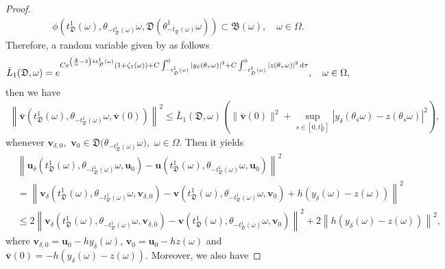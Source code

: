 \documentclass{elsarticle}
\theoremstyle{definition}
\numberwithin{equation}{section}
\renewcommand{\d}{{\rm{d}}}
\begin{document}
\begin{proof}
\begin{align}
 \phi \left ( t_{\mathfrak D}^1(\omega) , \theta_{-t_{\mathfrak D}^1(\omega)}\omega, \mathfrak D(\theta_{- t_{\mathfrak D}(\omega) }^1\omega) \right ) \subset \mathfrak B(\omega), \quad \omega\in \Omega .
\end{align}
Therefore,  a random variable given by as follows
\begin{align*}
\bar{L}_1({\mathfrak D}, \omega)=e^{C  e^{ \left(\frac 4 \alpha -3  \right)\lambda  t_{\mathfrak D}^1(\omega)}    ( 1+\zeta_1(\omega)  ) + C\int_{-t_{\mathfrak D}^1(\omega)}^0|y_\delta(\theta_{\tau} \omega)|^2+ C\int_{-t_{\mathfrak D}^1(\omega)}^0|z(\theta_{\tau} \omega)|^2 \, \d \tau } ,\quad \omega\in \Omega,
\end{align*}
then we have
\begin{align}
\left \|\bar{\textbf{v}} \! \left ( t_{\mathfrak D}^1 (\omega) ,\theta_{-t_{\mathfrak D}^1(\omega)}\omega, \bar{\textbf{v}}(0) \right) \right \|^2
 \leq \bar{L}_1({\mathfrak D}, \omega)\left (\|\bar{\textbf{v}}(0)\|^2+\sup\limits_{s\in[0,t_{\mathfrak D}^1]}|y_\delta(\theta_s\omega)-z(\theta_s\omega)|^2\right ) ,
\end{align}
whenever $\textbf{v}_{\delta,0},$ $\textbf{v}_{0}\in \mathfrak D \big ( \theta_{-t_{\mathfrak D}^1( \omega)}\omega \big),$  $\omega\in \Omega$. Then it yields
\begin{align*}
&\left \| \textbf{u}_\delta \! \left ( t_{\mathfrak D}^1 (\omega) ,\theta_{-t_{\mathfrak D}^1(\omega)}\omega,  \textbf{u}_{0}\right)
 - \textbf{u} \! \left ( t_{\mathfrak D}^1 (\omega) ,\theta_{-t_{\mathfrak D}^1(\omega)}\omega, \textbf{u}_{0}\right) \right \|^2
 \nonumber\\
& =\left \| \textbf{v}_\delta \! \left ( t_{\mathfrak D}^1 (\omega) ,\theta_{-t_{\mathfrak D}^1(\omega)}\omega,  \textbf{v}_{\delta,0}\right)
 - \textbf{v} \! \left ( t_{\mathfrak D}^1 (\omega) ,\theta_{-t_{\mathfrak D}^1(\omega)}\omega, \textbf{v}_{0}\right)+h(y_\delta(\omega)-z(\omega)) \right \|^2\nonumber\\
&\leq 2\left \| \textbf{v}_\delta \! \left ( t_{\mathfrak D}^1 (\omega) ,\theta_{-t_{\mathfrak D}^1(\omega)}\omega,  \textbf{v}_{\delta,0}\right)
 - \textbf{v} \! \left ( t_{\mathfrak D}^1 (\omega) ,\theta_{-t_{\mathfrak D}^1(\omega)}\omega, \textbf{v}_{0}\right)\right\|^2+2\left\|h\left (y_\delta(\omega)-z(\omega)\right ) \right \|^2,
\end{align*}
where $\textbf{v}_{\delta,0}=\textbf{u}_0-hy_\delta(\omega)$, $\textbf{v}_{0}=\textbf{u}_0-hz(\omega)$  and $\bar{\textbf{v}}(0)=-h(y_\delta(\omega)-z(\omega))$. Moreover, we also have

\end{proof}
\end{document}
